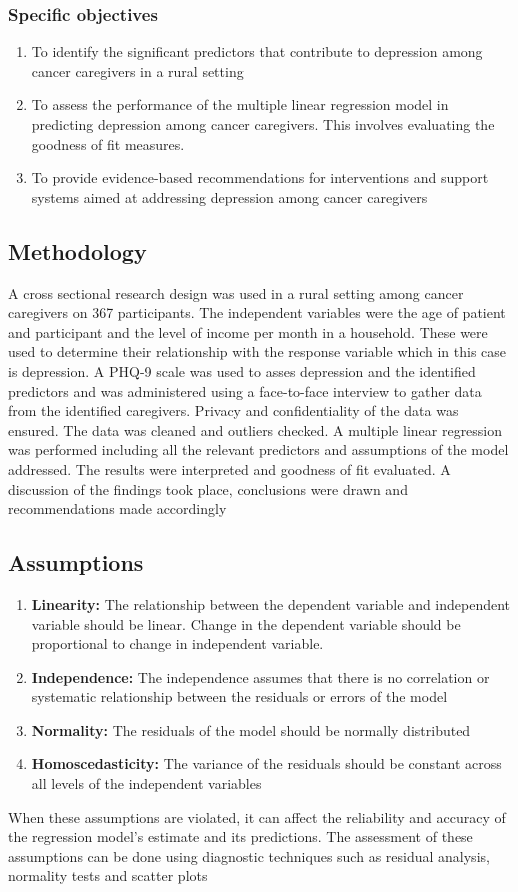\documentclass{article}
\numberwithin{equation}{section}
\begin{document}
\subsubsection{Specific objectives}
\begin{enumerate}
\item To identify the significant predictors that contribute to depression among cancer caregivers in a rural setting
\item To assess the performance of the multiple linear regression model in predicting depression among cancer caregivers. This involves evaluating the goodness of fit measures.
\item To provide evidence-based recommendations for interventions and support systems aimed at addressing depression among cancer caregivers
\end{enumerate}

\subsection{Methodology}
A cross sectional research design was used in a rural setting among cancer caregivers on 367 participants. The independent variables were the age of patient and participant and the level of income per month in a household. These were used to determine their relationship with the response variable which in this case is depression. A PHQ-9 scale was used to asses depression and the identified predictors and was administered using a face-to-face interview to gather data from the identified caregivers. Privacy and confidentiality of the data was ensured. The data was cleaned and outliers checked. A multiple linear regression was performed including all the relevant predictors and assumptions of the model addressed. The results were interpreted and goodness of fit evaluated. A discussion of the findings took place, conclusions were drawn and recommendations made accordingly
\subsection{Assumptions}
\begin{enumerate}
\item\textbf{ Linearity:} The relationship between the dependent variable and independent variable should be linear. Change in the dependent variable should be proportional to change in independent variable.
\item \textbf{Independence:} The independence assumes that there is no correlation or systematic relationship between the residuals or errors of the model
\item \textbf{Normality:} The residuals of the model should be normally distributed
\item \textbf{Homoscedasticity:} The variance of the residuals should be constant across all levels of the independent variables
\end{enumerate}
When these assumptions are violated, it can affect the reliability and accuracy of the regression model’s estimate and its predictions. The assessment of these assumptions can be done using diagnostic techniques such as residual analysis, normality tests and scatter plots
\end{document}
